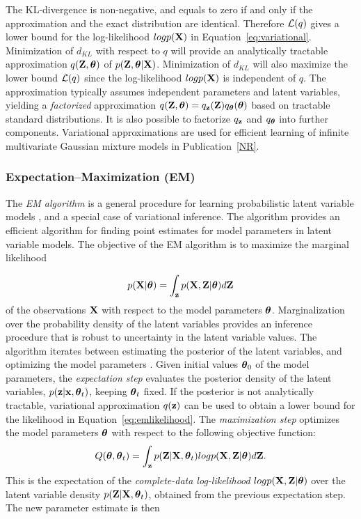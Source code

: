 The KL-divergence is non-negative, and equals to zero if and only if
the approximation and the exact distribution are identical. Therefore
\({\cal L}(q)\) gives a lower bound for the log-likelihood \(log p(\mathbf{X})\) in
Equation~\ref{eq:variational}.  Minimization of \(d_{KL}\) with
respect to \(q\) will provide an analytically tractable approximation
$q(\mathbf{Z}, \boldsymbol{\theta})$ of $p(\mathbf{Z}, \boldsymbol{\theta} | \mathbf{X})$.  Minimization of \(d_{KL}\) will
also maximize the lower bound \({\cal L}(q)\) since the log-likelihood \(log
p(\mathbf{X})\) is independent of \(q\). The approximation typically assumes
independent parameters and latent variables, yielding a {\it
  factorized} approximation \(q(\mathbf{Z}, \boldsymbol{\theta}) = q_{\mathbf{z}}(\mathbf{Z})q_{\boldsymbol{\theta}}(\boldsymbol{\theta})\)
based on tractable standard distributions. It is also possible to
factorize \(q_{\mathbf{z}}\) and \(q_{\boldsymbol{\theta}}\) into further
components. Variational approximations are used for efficient learning
of infinite multivariate Gaussian mixture models in
Publication~\ref{NR}. 

\subsubsection{Expectation--Maximization (EM)}\label{sec:em}

The {\it EM algorithm} is a general procedure for learning
probabilistic latent variable models \citep{Dempster77}, and a special
case of variational inference. The algorithm provides an efficient
algorithm for finding point estimates for model parameters in latent
variable models. The objective of the EM algorithm is to maximize the
marginal likelihood

\begin{equation}\label{eq:emlikelihood}
           p(\mathbf{X}|\boldsymbol{\theta}) = \int_{\mathbf{z}} p(\mathbf{X},\mathbf{Z}|\boldsymbol{\theta}) d\mathbf{Z}
\end{equation}
of the observations \(\mathbf{X}\) with respect to the model parameters
\(\boldsymbol{\theta}\). Marginalization over the probability density of the latent
variables provides an inference procedure that is robust to
uncertainty in the latent variable values. The algorithm iterates
between estimating the posterior of the latent variables, and
optimizing the model parameters \citep[see e.g.][]{Bishop06}.  Given
initial values \(\boldsymbol{\theta}_0\) of the model parameters, the {\it
  expectation step} evaluates the posterior density of the latent
variables, \(p(\mathbf{z}|\mathbf{x},\boldsymbol{\theta}_t)\), keeping \(\boldsymbol{\theta}_t\) fixed. If the
posterior is not analytically tractable, variational approximation
\(q(\mathbf{z})\) can be used to obtain a lower bound for the likelihood in
Equation~\ref{eq:emlikelihood}. The {\it maximization step} optimizes
the model parameters \(\boldsymbol{\theta}\) with respect to the following objective
function:
\begin{equation}\label{EMQ}
  Q(\boldsymbol{\theta}, \boldsymbol{\theta}_t) = \int_{\mathbf{z}} p(\mathbf{Z}|\mathbf{X}, \boldsymbol{\theta}_t) log p(\mathbf{X}, \mathbf{Z}| \boldsymbol{\theta}) d\mathbf{Z}.
\end{equation}
This is the expectation of the {\it complete-data log-likelihood}
\(log p(\mathbf{X}, \mathbf{Z}| \boldsymbol{\theta})\) over the latent variable density \(p(\mathbf{Z}|\mathbf{X},
\boldsymbol{\theta}_t)\), obtained from the previous expectation step. The new
parameter estimate is then

